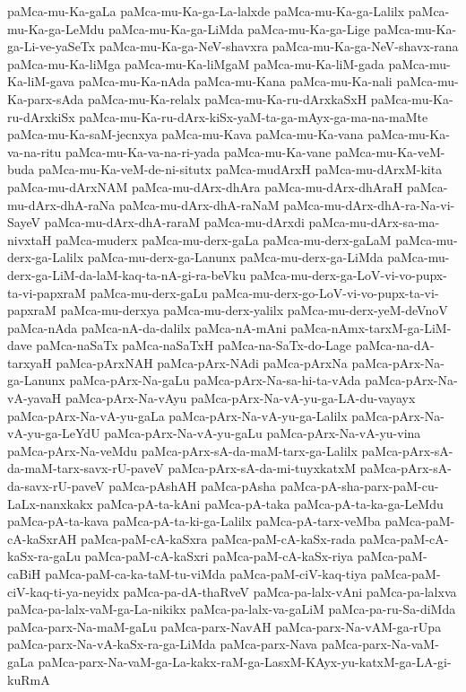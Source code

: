 {paMca-mu-Ka-gaLa
paMca-mu-Ka-ga-La-lalxde
paMca-mu-Ka-ga-Lalilx
paMca-mu-Ka-ga-LeMdu
paMca-mu-Ka-ga-LiMda
paMca-mu-Ka-ga-Lige
paMca-mu-Ka-ga-Li-ve-yaSeTx
paMca-mu-Ka-ga-NeV-shavxra
paMca-mu-Ka-ga-NeV-shavx-rana
paMca-mu-Ka-liMga
paMca-mu-Ka-liMgaM
paMca-mu-Ka-liM-gada
paMca-mu-Ka-liM-gava
paMca-mu-Ka-nAda
paMca-mu-Kana
paMca-mu-Ka-nali
paMca-mu-Ka-parx-sAda
paMca-mu-Ka-relalx
paMca-mu-Ka-ru-dArxkaSxH
paMca-mu-Ka-ru-dArxkiSx
paMca-mu-Ka-ru-dArx-kiSx-yaM-ta-ga-mAyx-ga-ma-na-maMte
paMca-mu-Ka-saM-jecnxya
paMca-mu-Kava
paMca-mu-Ka-vana
paMca-mu-Ka-va-na-ritu
paMca-mu-Ka-va-na-ri-yada
paMca-mu-Ka-vane
paMca-mu-Ka-veM-buda
paMca-mu-Ka-veM-de-ni-situtx
paMca-mudArxH
paMca-mu-dArxM-kita
paMca-mu-dArxNAM
paMca-mu-dArx-dhAra
paMca-mu-dArx-dhAraH
paMca-mu-dArx-dhA-raNa
paMca-mu-dArx-dhA-raNaM
paMca-mu-dArx-dhA-ra-Na-vi-SayeV
paMca-mu-dArx-dhA-raraM
paMca-mu-dArxdi
paMca-mu-dArx-sa-ma-nivxtaH
paMca-muderx
paMca-mu-derx-gaLa
paMca-mu-derx-gaLaM
paMca-mu-derx-ga-Lalilx
paMca-mu-derx-ga-Lanunx
paMca-mu-derx-ga-LiMda
paMca-mu-derx-ga-LiM-da-laM-kaq-ta-nA-gi-ra-beVku
paMca-mu-derx-ga-LoV-vi-vo-pupx-ta-vi-papxraM
paMca-mu-derx-gaLu
paMca-mu-derx-go-LoV-vi-vo-pupx-ta-vi-papxraM
paMca-mu-derxya
paMca-mu-derx-yalilx
paMca-mu-derx-yeM-deVnoV
paMca-nAda
paMca-nA-da-dalilx
paMca-nA-mAni
paMca-nAmx-tarxM-ga-LiM-dave
paMca-naSaTx
paMca-naSaTxH
paMca-na-SaTx-do-Lage
paMca-na-dA-tarxyaH
paMca-pArxNAH
paMca-pArx-NAdi
paMca-pArxNa
paMca-pArx-Na-ga-Lanunx
paMca-pArx-Na-gaLu
paMca-pArx-Na-sa-hi-ta-vAda
paMca-pArx-Na-vA-yavaH
paMca-pArx-Na-vAyu
paMca-pArx-Na-vA-yu-ga-LA-du-vayayx
paMca-pArx-Na-vA-yu-gaLa
paMca-pArx-Na-vA-yu-ga-Lalilx
paMca-pArx-Na-vA-yu-ga-LeYdU
paMca-pArx-Na-vA-yu-gaLu
paMca-pArx-Na-vA-yu-vina
paMca-pArx-Na-veMdu
paMca-pArx-sA-da-maM-tarx-ga-Lalilx
paMca-pArx-sA-da-maM-tarx-savx-rU-paveV
paMca-pArx-sA-da-mi-tuyxkatxM
paMca-pArx-sA-da-savx-rU-paveV
paMca-pAshAH
paMca-pAsha
paMca-pA-sha-parx-paM-cu-LaLx-nanxkakx
paMca-pA-ta-kAni
paMca-pA-taka
paMca-pA-ta-ka-ga-LeMdu
paMca-pA-ta-kava
paMca-pA-ta-ki-ga-Lalilx
paMca-pA-tarx-veMba
paMca-paM-cA-kaSxrAH
paMca-paM-cA-kaSxra
paMca-paM-cA-kaSx-rada
paMca-paM-cA-kaSx-ra-gaLu
paMca-paM-cA-kaSxri
paMca-paM-cA-kaSx-riya
paMca-paM-caBiH
paMca-paM-ca-ka-taM-tu-viMda
paMca-paM-ciV-kaq-tiya
paMca-paM-ciV-kaq-ti-ya-neyidx
paMca-pa-dA-thaRveV
paMca-pa-lalx-vAni
paMca-pa-lalxva
paMca-pa-lalx-vaM-ga-La-nikikx
paMca-pa-lalx-va-gaLiM
paMca-pa-ru-Sa-diMda
paMca-parx-Na-maM-gaLu
paMca-parx-NavAH
paMca-parx-Na-vAM-ga-rUpa
paMca-parx-Na-vA-kaSx-ra-ga-LiMda
paMca-parx-Nava
paMca-parx-Na-vaM-gaLa
paMca-parx-Na-vaM-ga-La-kakx-raM-ga-LasxM-KAyx-yu-katxM-ga-LA-gi-kuRmA
}
